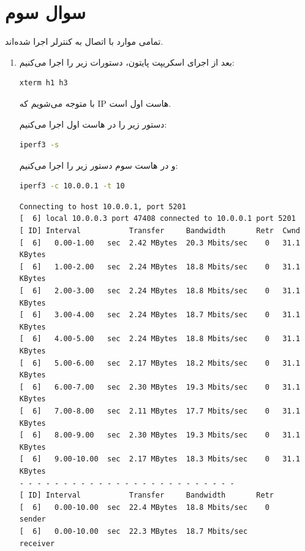 \documentclass[12pt]{article}
\begin{document}
\newpage
\section*{سوال سوم}

تمامی موارد با اتصال به کنترلر  اجرا شده‌اند.

\begin{enumerate}
	\item 
	بعد از اجرای اسکریپت پایتون، دستورات زیر را اجرا می‌کنیم:
	
	\begin{latin}
		\begin{lstlisting}[language=bash]
			xterm h1 h3
		\end{lstlisting}
	\end{latin}
	
	با  متوجه‌ می‌شویم که IP هاست اول  است.
	
	دستور زیر را در هاست اول اجرا می‌کنیم:
	
	\begin{latin}
		\begin{lstlisting}[language=bash]
			iperf3 -s
		\end{lstlisting}
	\end{latin}
	
	و در هاست سوم دستور زیر را اجرا می‌کنیم:
	\begin{latin}
		\begin{lstlisting}[language=bash]
			iperf3 -c 10.0.0.1 -t 10
		\end{lstlisting}
	\end{latin}
	
	\begin{latin}
		\begin{Verbatim}
Connecting to host 10.0.0.1, port 5201
[  6] local 10.0.0.3 port 47408 connected to 10.0.0.1 port 5201
[ ID] Interval           Transfer     Bandwidth       Retr  Cwnd
[  6]   0.00-1.00   sec  2.42 MBytes  20.3 Mbits/sec    0   31.1 KBytes       
[  6]   1.00-2.00   sec  2.24 MBytes  18.8 Mbits/sec    0   31.1 KBytes       
[  6]   2.00-3.00   sec  2.24 MBytes  18.8 Mbits/sec    0   31.1 KBytes       
[  6]   3.00-4.00   sec  2.24 MBytes  18.7 Mbits/sec    0   31.1 KBytes       
[  6]   4.00-5.00   sec  2.24 MBytes  18.8 Mbits/sec    0   31.1 KBytes       
[  6]   5.00-6.00   sec  2.17 MBytes  18.2 Mbits/sec    0   31.1 KBytes       
[  6]   6.00-7.00   sec  2.30 MBytes  19.3 Mbits/sec    0   31.1 KBytes       
[  6]   7.00-8.00   sec  2.11 MBytes  17.7 Mbits/sec    0   31.1 KBytes       
[  6]   8.00-9.00   sec  2.30 MBytes  19.3 Mbits/sec    0   31.1 KBytes       
[  6]   9.00-10.00  sec  2.17 MBytes  18.3 Mbits/sec    0   31.1 KBytes       
- - - - - - - - - - - - - - - - - - - - - - - - -
[ ID] Interval           Transfer     Bandwidth       Retr
[  6]   0.00-10.00  sec  22.4 MBytes  18.8 Mbits/sec    0             sender
[  6]   0.00-10.00  sec  22.3 MBytes  18.7 Mbits/sec                  receiver



\end{Verbatim}
\end{latin}
\end{enumerate}
\end{document}
